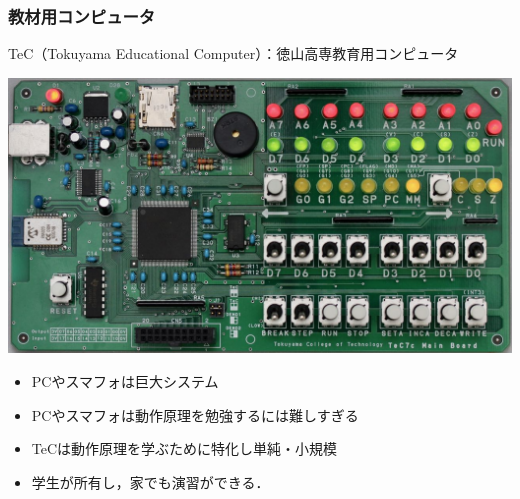 \documentclass{beamer}                 %
\begin{document}
\begin{frame}
  \frametitle{教材用コンピュータ}
  TeC（Tokuyama Educational Computer）：徳山高専教育用コンピュータ

  \centerline{\includegraphics[scale=0.2]{../Img/TeC7c.jpg}}
  \begin{itemize}
  \item PCやスマフォは巨大システム
  \item PCやスマフォは動作原理を勉強するには難しすぎる
  \item TeCは動作原理を学ぶために特化し単純・小規模
  \item 学生が所有し，家でも演習ができる．
  \end{itemize}
  \vfill
\end{frame}
\end{document}
